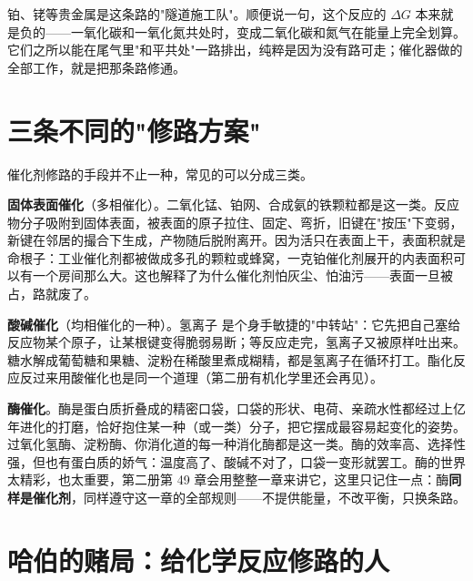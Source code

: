 铂、铑等贵金属是这条路的"隧道施工队"。顺便说一句，这个反应的 $\Delta G$ 本来就是负的——一氧化碳和一氧化氮共处时，变成二氧化碳和氮气在能量上完全划算。它们之所以能在尾气里"和平共处"一路排出，纯粹是因为没有路可走；催化器做的全部工作，就是把那条路修通。

\section{三条不同的"修路方案"}

催化剂修路的手段并不止一种，常见的可以分成三类。

\textbf{固体表面催化}（多相催化）。二氧化锰、铂网、合成氨的铁颗粒都是这一类。反应物分子吸附到固体表面，被表面的原子拉住、固定、弯折，旧键在"按压"下变弱，新键在邻居的撮合下生成，产物随后脱附离开。因为活只在表面上干，表面积就是命根子：工业催化剂都被做成多孔的颗粒或蜂窝，一克铂催化剂展开的内表面积可以有一个房间那么大。这也解释了为什么催化剂怕灰尘、怕油污——表面一旦被占，路就废了。

\textbf{酸碱催化}（均相催化的一种）。氢离子  是个身手敏捷的"中转站"：它先把自己塞给反应物某个原子，让某根键变得脆弱易断；等反应走完，氢离子又被原样吐出来。糖水解成葡萄糖和果糖、淀粉在稀酸里煮成糊精，都是氢离子在循环打工。酯化反应反过来用酸催化也是同一个道理（第二册有机化学里还会再见）。

\textbf{酶催化}。酶是蛋白质折叠成的精密口袋，口袋的形状、电荷、亲疏水性都经过上亿年进化的打磨，恰好抱住某一种（或一类）分子，把它摆成最容易起变化的姿势。过氧化氢酶、淀粉酶、你消化道的每一种消化酶都是这一类。酶的效率高、选择性强，但也有蛋白质的娇气：温度高了、酸碱不对了，口袋一变形就罢工。酶的世界太精彩，也太重要，第二册第 49 章会用整整一章来讲它，这里只记住一点：酶\textbf{同样是催化剂}，同样遵守这一章的全部规则——不提供能量，不改平衡，只换条路。

\section{哈伯的赌局：给化学反应修路的人}

